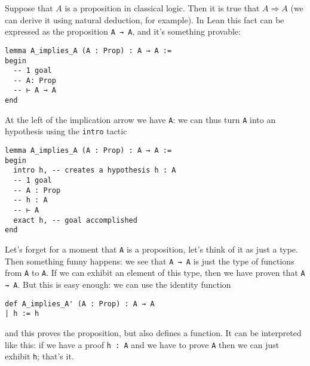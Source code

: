 \documentclass{book}
\theoremstyle{definition}
\theoremstyle{remark}
\theoremstyle{plain}
\begin{document}
Suppose that $A$ is a proposition in classical logic.
Then it is true that $A \Rightarrow A$ (we can derive it using natural deduction, for example).
In Lean this fact can be expressed as the proposition \lstinline{A → A}, and it's something provable:
\begin{lstlisting}
lemma A_implies_A (A : Prop) : A → A :=
begin
  -- 1 goal
  -- A: Prop
  -- ⊢ A → A
end
\end{lstlisting}
At the left of the implication arrow we have \lstinline{A}:
we can thus turn \lstinline{A} into an hypothesis using the \lstinline{intro} tactic
\begin{lstlisting}
lemma A_implies_A (A : Prop) : A → A :=
begin
  intro h, -- creates a hypothesis h : A
  -- 1 goal
  -- A : Prop
  -- h : A
  -- ⊢ A
  exact h, -- goal accomplished
end
\end{lstlisting}
Let's forget for a moment that \lstinline{A} is a proposition, let's think of it as just a type.
Then something funny happens: we see that \lstinline{A → A} is just the type of functions from \lstinline{A} to \lstinline{A}.
If we can exhibit an element of this type, then we have proven that \lstinline{A → A}.
But this is easy enough: we can use the identity function
\begin{lstlisting}
def A_implies_A' (A : Prop) : A → A
| h := h    
\end{lstlisting}
and this proves the proposition, but also defines a function.
It can be interpreted like this:
if we have a proof \lstinline{h : A} and we have to prove \lstinline{A} then we can just exhibit \lstinline{h}; that's it.
\end{document}
